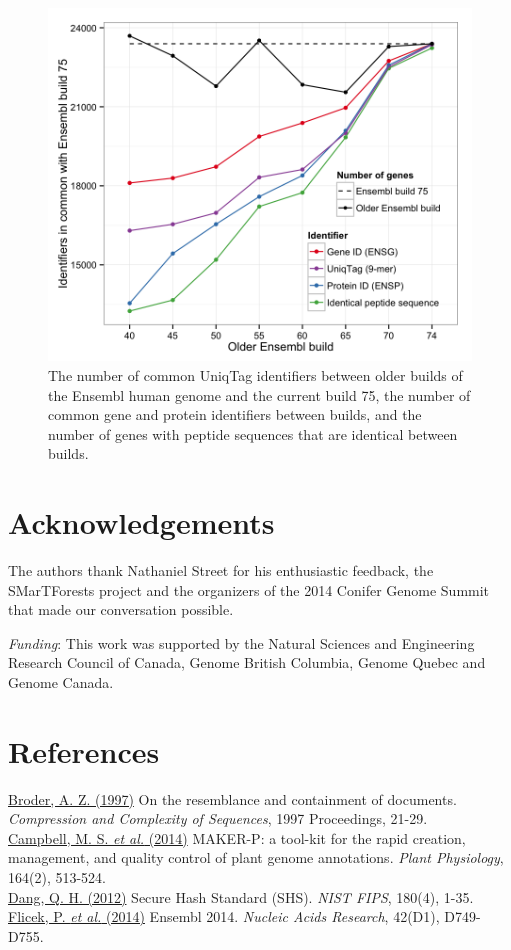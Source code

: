 \documentclass{bioinfo}
\begin{document}
\begin{figure}[htbp]
\centering
\includegraphics{figure/ensembl.png}
\caption{The number of common UniqTag identifiers between older builds
of the Ensembl human genome and the current build 75, the number of
common gene and protein identifiers between builds, and the number of
genes with peptide sequences that are identical between builds.}
\end{figure}

\section*{Acknowledgements}\label{acknowledgements}

The authors thank Nathaniel Street for his enthusiastic feedback, the
SMarTForests project and the organizers of the 2014 Conifer Genome
Summit that made our conversation possible.

\emph{Funding}: This work was supported by the Natural Sciences and
Engineering Research Council of Canada, Genome British Columbia, Genome
Quebec and Genome Canada.

\section*{References}\label{references}

\href{http://dx.doi.org/10.1109/SEQUEN.1997.666900}{Broder, A. Z.
(1997)} On the resemblance and containment of documents.
\emph{Compression and Complexity of Sequences}, 1997 Proceedings,
21-29.\\\href{http://dx.doi.org/10.1104/pp.113.230144}{Campbell, M. S.
\emph{et al.} (2014)} MAKER-P: a tool-kit for the rapid creation,
management, and quality control of plant genome annotations. \emph{Plant
Physiology}, 164(2),
513-524.\\\href{http://www.nist.gov/manuscript-publication-search.cfm?pub_id=910977}{Dang,
Q. H. (2012)} Secure Hash Standard (SHS). \emph{NIST FIPS}, 180(4),
1-35.\\\href{http://dx.doi.org/10.1093/nar/gkt1196}{Flicek, P. \emph{et
al.} (2014)} Ensembl 2014. \emph{Nucleic Acids Research}, 42(D1),
D749-D755.
\end{document}
